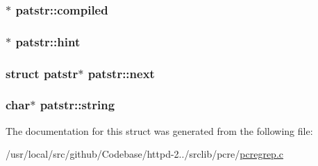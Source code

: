 \subsubsection[{\texorpdfstring{compiled}{compiled}}]{$\ast$ patstr\+::compiled}\hypertarget{structpatstr_ad1e85c1c7136d7fac5f9ffd16367181a}{}\label{structpatstr_ad1e85c1c7136d7fac5f9ffd16367181a}
\subsubsection[{\texorpdfstring{hint}{hint}}]{$\ast$ patstr\+::hint}\hypertarget{structpatstr_abd8c131927550a90cb7e51bd4159e3c6}{}\label{structpatstr_abd8c131927550a90cb7e51bd4159e3c6}
\subsubsection[{\texorpdfstring{next}{next}}]{\setlength{\rightskip}{0pt plus 5cm}struct {\bf patstr}$\ast$ patstr\+::next}\hypertarget{structpatstr_afa4a52cc40795b8fa39d81378aad1269}{}\label{structpatstr_afa4a52cc40795b8fa39d81378aad1269}
\subsubsection[{\texorpdfstring{string}{string}}]{\setlength{\rightskip}{0pt plus 5cm}char$\ast$ patstr\+::string}\hypertarget{structpatstr_a9774093b992baa8bf55c39fd2aecb95d}{}\label{structpatstr_a9774093b992baa8bf55c39fd2aecb95d}


The documentation for this struct was generated from the following file\+:\begin{DoxyCompactItemize}
\item 
/usr/local/src/github/\+Codebase/httpd-\/2../srclib/pcre/\hyperlink{pcregrep_8c}{pcregrep.\+c}\end{DoxyCompactItemize}
